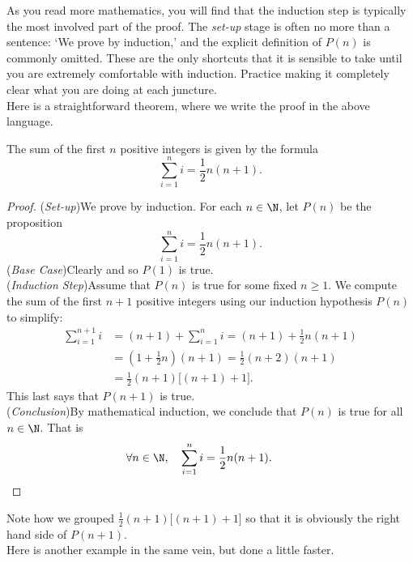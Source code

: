 As you read more mathematics, you will find that the induction step is typically the most involved part of the proof. The \emph{set-up} stage is often no more than a sentence: `We prove by induction,' and the explicit definition of $P(n)$ is commonly omitted. These are the only shortcuts that it is sensible to take until you are extremely comfortable with induction. Practice making it completely clear what you are doing at each juncture.\\

Here is a straightforward theorem, where we write the proof in the above language.

\begin{thm}\label{thm:ind1}
The sum of the first $n$ positive integers is given by the formula
\[\sum_{i=1}^ni=\frac 12n(n+1).\]
\end{thm}

\begin{proof}
(\emph{Set-up})\quad We prove by induction. For each $n\in\N$, let $P(n)$ be the proposition
\[\sum_{i=1}^ni=\frac 12n(n+1).\]
(\emph{Base Case})\quad Clearly  and so $P(1)$ is true.\\[5pt]
(\emph{Induction Step})\quad Assume that $P(n)$ is true for some fixed $n\ge 1$. We compute the sum of the first $n+1$ positive integers using our induction hypothesis $P(n)$ to simplify:
  \begin{align*}
	\sum_{i=1}^{n+1}i&=(n+1)+\sum_{i=1}^ni=(n+1)+\frac 12n(n+1)\tag*{(by assumption of $P(n)$)}\\
	&=\left(1+\frac 12n\right)(n+1)=\frac 12(n+2)(n+1)\\
	&=\frac 12(n+1)\bigl[(n+1)+1\bigr].
  \end{align*}
This last says that $P(n+1)$ is true.\\[5pt]
(\emph{Conclusion})\quad By mathematical induction, we conclude that $P(n)$ is true for all $n\in\N$. That is
\begin{gather*}
\forall n\in\N,\quad \sum\limits_{i=1}^ni=\frac 12n(n+1).\tag*{\qedhere}
\end{gather*}
\end{proof}

\noindent Note how we grouped $\frac 12(n+1)\bigl[(n+1)+1\bigr]$ so that it is obviously the right hand side of $P(n+1)$.\\

\noindent Here is another example in the same vein, but done a little faster.


